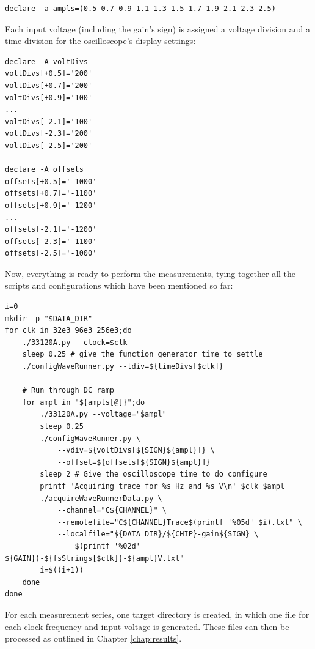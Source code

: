 \begin{verbatim}
declare -a ampls=(0.5 0.7 0.9 1.1 1.3 1.5 1.7 1.9 2.1 2.3 2.5)
\end{verbatim}

Each input voltage (including the gain's  sign) is assigned a voltage division
and a time division for the oscilloscope's display settings\footnotemark:

\begin{verbatim}
declare -A voltDivs
voltDivs[+0.5]='200'
voltDivs[+0.7]='200'
voltDivs[+0.9]='100'
...
voltDivs[-2.1]='100'
voltDivs[-2.3]='200'
voltDivs[-2.5]='200'

declare -A offsets
offsets[+0.5]='-1000'
offsets[+0.7]='-1100'
offsets[+0.9]='-1200'
...
offsets[-2.1]='-1200'
offsets[-2.3]='-1100'
offsets[-2.5]='-1000'
\end{verbatim}


Now, everything is  ready to perform the measurements, tying  together all the
scripts and configurations which have been mentioned so far:

\begin{verbatim}
i=0
mkdir -p "$DATA_DIR"
for clk in 32e3 96e3 256e3;do
    ./33120A.py --clock=$clk
    sleep 0.25 # give the function generator time to settle
    ./configWaveRunner.py --tdiv=${timeDivs[$clk]}

    # Run through DC ramp
    for ampl in "${ampls[@]}";do
        ./33120A.py --voltage="$ampl"
        sleep 0.25
        ./configWaveRunner.py \
            --vdiv=${voltDivs[${SIGN}${ampl}]} \
            --offset=${offsets[${SIGN}${ampl}]}
        sleep 2 # Give the oscilloscope time to do configure
        printf 'Acquiring trace for %s Hz and %s V\n' $clk $ampl
        ./acquireWaveRunnerData.py \
            --channel="C${CHANNEL}" \
            --remotefile="C${CHANNEL}Trace$(printf '%05d' $i).txt" \
            --localfile="${DATA_DIR}/${CHIP}-gain${SIGN} \
                $(printf '%02d' ${GAIN})-${fsStrings[$clk]}-${ampl}V.txt"
        i=$((i+1))
    done
done
\end{verbatim}

For each  measurement series, one  target directory  is created, in  which one
file for each clock frequency and  input voltage is generated. These files can
then be processed as outlined in Chapter \ref{chap:results}.


